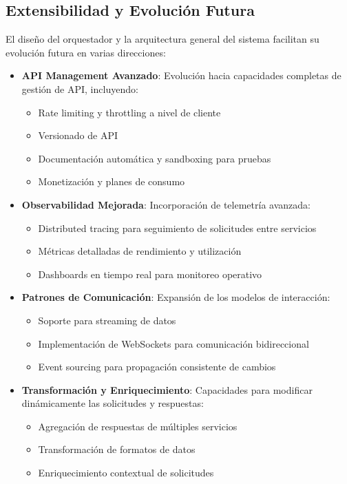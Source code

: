 \documentclass[12pt,a4paper]{article}
\begin{document}
\subsection{Extensibilidad y Evolución Futura}
\label{subsec:os-extension}

El diseño del orquestador y la arquitectura general del sistema facilitan su evolución futura en varias direcciones:

\begin{itemize}
    \item \textbf{API Management Avanzado}: Evolución hacia capacidades completas de gestión de API, incluyendo:
    \begin{itemize}
        \item Rate limiting y throttling a nivel de cliente
        \item Versionado de API
        \item Documentación automática y sandboxing para pruebas
        \item Monetización y planes de consumo
    \end{itemize}
    
    \item \textbf{Observabilidad Mejorada}: Incorporación de telemetría avanzada:
    \begin{itemize}
        \item Distributed tracing para seguimiento de solicitudes entre servicios
        \item Métricas detalladas de rendimiento y utilización
        \item Dashboards en tiempo real para monitoreo operativo
    \end{itemize}
    
    \item \textbf{Patrones de Comunicación}: Expansión de los modelos de interacción:
    \begin{itemize}
        \item Soporte para streaming de datos
        \item Implementación de WebSockets para comunicación bidireccional
        \item Event sourcing para propagación consistente de cambios
    \end{itemize}
    
    \item \textbf{Transformación y Enriquecimiento}: Capacidades para modificar dinámicamente las solicitudes y respuestas:
    \begin{itemize}
        \item Agregación de respuestas de múltiples servicios
        \item Transformación de formatos de datos
        \item Enriquecimiento contextual de solicitudes
    \end{itemize}
    

\end{itemize}
\end{document}
